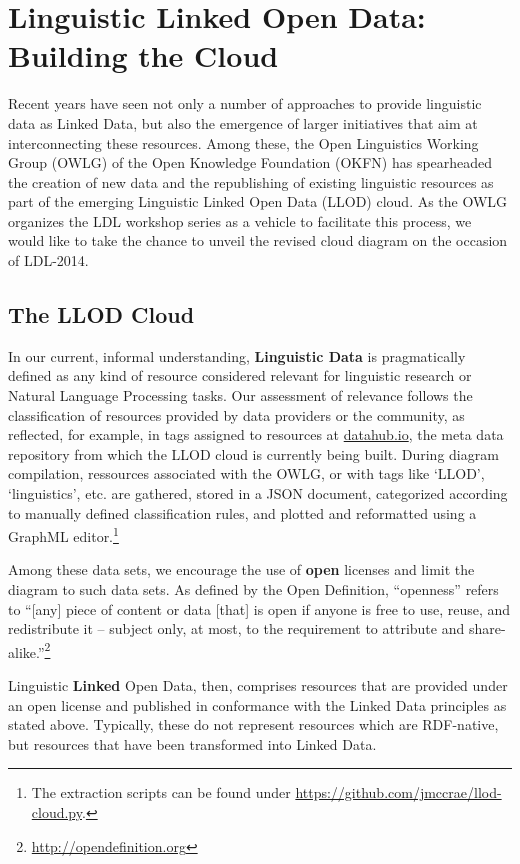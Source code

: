 \section{Linguistic Linked Open Data: Building the Cloud}

Recent years have seen not only a number of approaches to provide linguistic data as Linked Data, but also the emergence of larger initiatives that aim at interconnecting these resources.
Among these, the Open Linguistics Working Group (OWLG) of the Open Knowledge Foundation (OKFN) has spearheaded the creation of 
new data and the republishing of existing linguistic resources as part of the emerging Linguistic Linked Open Data (LLOD) cloud. 
As the OWLG organizes the LDL workshop series as a vehicle to facilitate this process, we would like to take the chance to unveil the revised cloud diagram on the occasion of LDL-2014.

\subsection{The LLOD Cloud}

In our current, informal understanding, \textbf{Linguistic Data} is pragmatically defined as any kind of resource considered relevant for linguistic research or Natural Language Processing tasks. 
Our assessment of relevance follows the classification of resources provided by data providers or the community, as reflected, for example, in tags assigned to resources at \url{datahub.io}, the meta data repository from which the LLOD cloud is currently being built. During diagram compilation, ressources associated with the OWLG, or with tags like `LLOD', `linguistics', etc. are gathered, stored in a JSON document, categorized according to manually defined classification rules, and plotted and reformatted using a GraphML editor.\footnote{
	The extraction scripts can be found under \url{https://github.com/jmccrae/llod-cloud.py}.
}

Among these data sets, we encourage the use of \textbf{open} licenses and limit the diagram to such data sets. As defined by the Open Definition, ``openness'' refers to ``[any] piece of content or data [that] is open if anyone is free to use, reuse, and redistribute it -- subject only, at most, to the requirement to attribute and share-alike.''\footnote{\url{http://opendefinition.org}}

Linguistic \textbf{Linked} Open Data, then, comprises resources that are provided under an open license and published in conformance with the Linked Data principles as stated above.
Typically, these do not represent resources which are RDF-native, but resources that have been transformed into Linked Data. 

